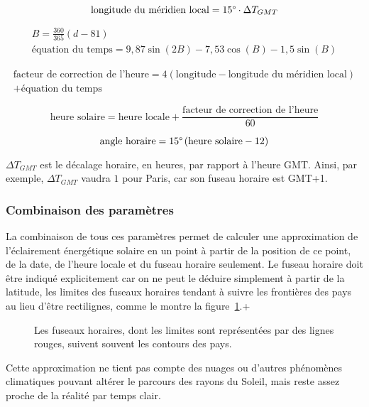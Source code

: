 \documentclass[12pt]{article}
\begin{document}
\[
	\text{longitude du méridien local} = 15 \degree \cdot \Delta T_{GMT}
\]

\begin{gather*}
	B = \frac{360}{365} \left( d - 81 \right) \\
	\text{équation du temps} = 9,87 \sin \left( 2B \right) - 7,53 \cos \left( B \right) - 1,5 \sin \left( B \right)
\end{gather*}

\begin{multline*}
	\text{facteur de correction de l'heure} = 4 \left( \text{longitude} - \text{longitude du méridien local} \right) \\ + \text{équation du temps}
\end{multline*}

\[
	\text{heure solaire} = \text{heure locale} + \frac{\text{facteur de correction de l'heure}}{60}
\]

\[
	\text{angle horaire} = 15 \degree \left(
		\text{heure solaire} - 12
	\right)
\]

$\Delta T_{GMT}$ est le décalage horaire, en heures, par rapport à l'heure GMT. Ainsi, par exemple, $\Delta T_{GMT}$ vaudra $1$ pour Paris, car son fuseau horaire est GMT+1.

\subsubsection{Combinaison des paramètres}
La combinaison de tous ces paramètres permet de calculer une approximation de l'éclairement énergétique solaire en un point à partir de la position de ce point, de la date, de l'heure locale et du fuseau horaire seulement.
Le fuseau horaire doit être indiqué explicitement car on ne peut le déduire simplement à partir de la latitude, les limites des fuseaux horaires tendant à suivre les frontières des pays au lieu d'être rectilignes, comme le montre la figure~\ref{fig:timezones}.+

\begin{figure}[!ht]
  \centering
  \caption{Les fuseaux horaires, dont les limites sont représentées par des lignes rouges, suivent souvent les contours des pays.}
  \label{fig:timezones}
\end{figure}

Cette approximation ne tient pas compte des nuages ou d'autres phénomènes climatiques pouvant altérer le parcours des rayons du Soleil, mais reste assez proche de la réalité par temps clair.
\end{document}

